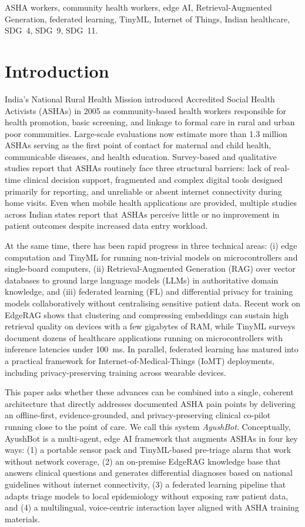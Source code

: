 \documentclass[conference]{IEEEtran}
\begin{document}
\begin{IEEEkeywords}
ASHA workers, community health workers, edge AI, Retrieval-Augmented Generation, federated learning, TinyML, Internet of Things, Indian healthcare, SDG~4, SDG~9, SDG~11.
\end{IEEEkeywords}

\section{Introduction}
India's National Rural Health Mission introduced Accredited Social Health Activists (ASHAs) in 2005 as community-based health workers responsible for health promotion, basic screening, and linkage to formal care in rural and urban poor communities. Large-scale evaluations now estimate more than 1.3 million ASHAs serving as the first point of contact for maternal and child health, communicable diseases, and health education. Survey-based and qualitative studies report that ASHAs routinely face three structural barriers: lack of real-time clinical decision support, fragmented and complex digital tools designed primarily for reporting, and unreliable or absent internet connectivity during home visits. Even when mobile health applications are provided, multiple studies across Indian states report that ASHAs perceive little or no improvement in patient outcomes despite increased data entry workload.

At the same time, there has been rapid progress in three technical areas: (i) edge computation and TinyML for running non-trivial models on microcontrollers and single-board computers, (ii) Retrieval-Augmented Generation (RAG) over vector databases to ground large language models (LLMs) in authoritative domain knowledge, and (iii) federated learning (FL) and differential privacy for training models collaboratively without centralising sensitive patient data. Recent work on EdgeRAG shows that clustering and compressing embeddings can sustain high retrieval quality on devices with a few gigabytes of RAM, while TinyML surveys document dozens of healthcare applications running on microcontrollers with inference latencies under 100~ms. In parallel, federated learning has matured into a practical framework for Internet-of-Medical-Things (IoMT) deployments, including privacy-preserving training across wearable devices.

This paper asks whether these advances can be combined into a single, coherent architecture that directly addresses documented ASHA pain points by delivering an offline-first, evidence-grounded, and privacy-preserving clinical co-pilot running close to the point of care. We call this system \emph{AyushBot}. Conceptually, AyushBot is a multi-agent, edge AI framework that augments ASHAs in four key ways: (1) a portable sensor pack and TinyML-based pre-triage alarm that work without network coverage, (2) an on-premise EdgeRAG knowledge base that answers clinical questions and generates differential diagnoses based on national guidelines without internet connectivity, (3) a federated learning pipeline that adapts triage models to local epidemiology without exposing raw patient data, and (4) a multilingual, voice-centric interaction layer aligned with ASHA training materials.
\end{document}
